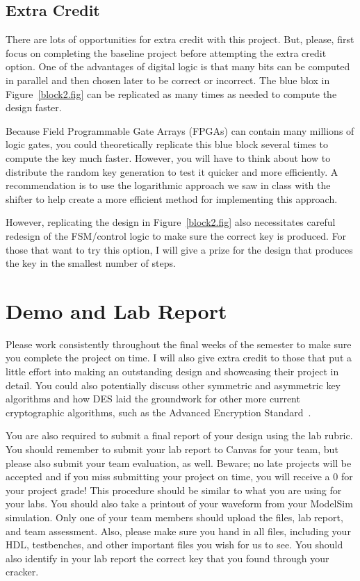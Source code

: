 \documentclass{article}
\begin{document}
\subsection{Extra Credit}

There are lots of opportunities for extra credit with this project.
But, please, first focus on completing the baseline project before
attempting the extra credit option.  One of the advantages of digital
logic is that many bits can be computed in parallel and then chosen
later to be correct or incorrect.  The blue blox in
Figure~\ref{block2.fig} can be replicated as many times as needed to
compute the design faster.

Because Field Programmable Gate Arrays
(FPGAs) can contain many millions of logic gates, you could
theoretically replicate this blue block several times to compute the key much
faster.  However, you will have to think about how to distribute the
random key generation to test it quicker and more efficiently.  A
recommendation is to use the logarithmic approach we saw in class
with the shifter to help create a more efficient method for
implementing this approach.

However, replicating the design in Figure~\ref{block2.fig} also
necessitates careful redesign of the FSM/control logic to make sure
the correct key is produced.  For those that want to try this option,
I will give a prize for the design that produces the key in the
smallest number of steps.

\section{Demo and Lab Report}

Please work
consistently throughout the final weeks of the semester to make sure
you complete the project on time.
I will also give extra credit to those that put a little effort into
making an outstanding design and showcasing their project in detail.
You could also potentially discuss other symmetric and asymmetric
key algorithms and how DES laid the groundwork for other more
current cryptographic algorithms, such as the Advanced Encryption
Standard~\cite{10.5555/1721909}.

You are also required to submit a final report of your design using
the lab rubric.  You should remember to submit your lab report
to Canvas for
your team, but please also submit your team evaluation, as well.
Beware; no
late projects will be accepted and if you miss submitting your project
on time, you will receive a $0$ for your project grade!  This
procedure should be similar to what you are using for your labs.
You should also take a printout of your waveform 
from your ModelSim simulation.  
Only one of your team members should upload
the files, lab report, and team assessment.  Also, please make sure you
hand in all files, including your HDL, testbenches, and other
important files you wish for us to see.  You should also identify in
your lab report the
correct key that you found through your cracker.  
\end{document}

